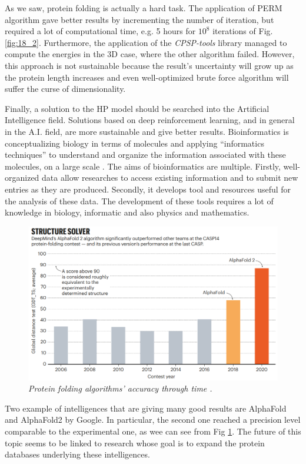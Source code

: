 As we saw, protein folding is actually a hard task.
The application of PERM algorithm gave better results by incrementing the number of iteration, but required a lot of computational time, e.g. 5 hours for $10^8$ iterations of Fig. \ref{fig:18_2}.
Furthermore, the application of the \emph{CPSP-tools} library managed to compute the energies in the 3D case, where the other algorithm failed.
However, this approach is not sustainable because the result's uncertainty will grow up as the protein length increases and even well-optimized brute force algorithm will suffer the curse of dimensionality.


Finally, a solution to the HP model should be searched into the Artificial Intelligence field.
Solutions based on deep reinforcement learning, and in general in the A.I. field, are more sustainable and give better results.
Bioinformatics is conceptualizing biology in terms of molecules and applying ``informatics techniques'' to understand and organize the information associated with these molecules, on a large scale \cite{bioinfo}.
The aims of bioinformatics are multiple.
Firstly, well-organized data allow researches to access existing information and to submit new entries as they are produced.
Secondly, it develops tool and resources useful for the analysis of these data.
The development of these tools requires a lot of knowledge in biology, informatic and also physics and mathematics.
\begin{figure}[H]
    \centering
    \includegraphics[width=.75\textwidth]{./img/alphafold.png}
    \caption{\emph{Protein folding algorithms' accuracy through time \cite{alphafold}.}}
    \label{fig:alphafold}
\end{figure}
Two example of intelligences that are giving many good results are AlphaFold and AlphaFold2 by Google.
In particular, the second one reached a precision level comparable to the experimental one, as wee can see from Fig \ref{fig:alphafold}.
The future of this topic seems to be linked to research whose goal is to expand the protein databases underlying these intelligences.